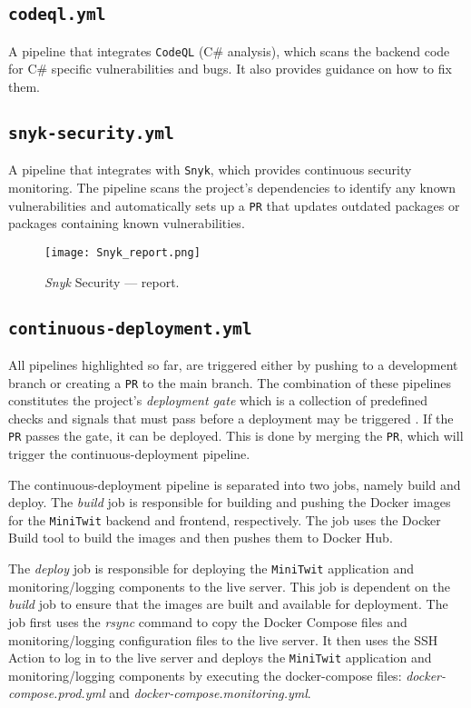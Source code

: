 \subsection{\texttt{codeql.yml}}

A pipeline that integrates \texttt{CodeQL} (C\# analysis), which scans the backend code for C\# specific vulnerabilities and bugs. It also provides guidance on how to fix them.

\subsection{\texttt{snyk-security.yml}}

A pipeline that integrates with \texttt{Snyk}, which provides continuous security monitoring. The pipeline scans the project's dependencies to identify any known vulnerabilities and automatically sets up a \texttt{PR} that updates outdated packages or packages containing known vulnerabilities. 

\begin{figure}[H]
    \centering
    \texttt{[image: Snyk\_report.png]}
    \caption{\textit{Snyk} Security --- report.}
    \label{fig:snyk_report}
\end{figure}

\subsection{\texttt{continuous-deployment.yml}}

All pipelines highlighted so far, are triggered either by pushing to a development branch or creating a \texttt{PR} to the main branch. The combination of these pipelines constitutes the project's \textit{deployment gate} which is a collection of predefined checks and signals that must pass before a deployment may be triggered \cite{DevOps_gates}. If the \texttt{PR} passes the gate, it can be deployed. This is done by merging the \texttt{PR}, which will trigger the continuous-deployment pipeline.

The continuous-deployment pipeline is separated into two jobs, namely build and deploy. The \textit{build} job is responsible for building and pushing the Docker images for the \texttt{MiniTwit} backend and frontend, respectively. The job uses the Docker Build tool to build the images and then pushes them to Docker Hub.

The \textit{deploy} job is responsible for deploying the \texttt{MiniTwit} application and monitoring/logging components to the live server. This job is dependent on the \textit{build} job to ensure that the images are built and available for deployment. The job first uses the \textit{rsync} command to copy the Docker Compose files and monitoring/logging configuration files to the live server. It then uses the SSH Action to log in to the live server and deploys the \texttt{MiniTwit} application and monitoring/logging components by executing the docker-compose files: \textit{docker-compose.prod.yml} and \textit{docker-compose.monitoring.yml}.

